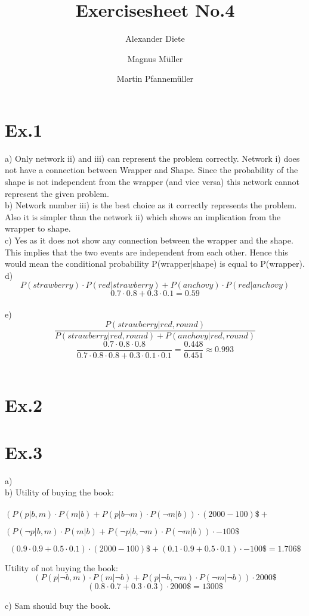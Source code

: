 \documentclass[11pt]{article}
\title{Exercisesheet No.4}
\author{Alexander Diete \and Magnus M\"uller \and Martin Pfannem\"uller}
\begin{document}
\maketitle

\section*{Ex.1}
a) Only network ii) and iii) can represent the problem correctly. Network i) does not have a connection between Wrapper and Shape. Since the probability of the shape is not independent from the wrapper (and vice versa) this network cannot represent the given problem. \\

b) Network number iii) is the best choice as it correctly represents the problem. Also it is simpler than the network ii) which shows an implication from the wrapper to shape. \\

c) Yes as it does not show any connection between the wrapper and the shape. This implies that the two events are independent from each other. Hence this would mean the conditional probability P(wrapper|shape) is equal to P(wrapper). \\

d) 
$$P(strawberry) \cdot P(red|strawberry) + P(anchovy) \cdot P(red|anchovy)$$
$$0.7 \cdot 0.8 + 0.3 \cdot 0.1 = 0.59$$ \\

e)
$$\frac{P(strawberry | red, round)}{P(strawberry | red, round) + P(anchovy | red, round)}$$
$$\frac{0.7 \cdot 0.8 \cdot 0.8}{0.7 \cdot 0.8 \cdot 0.8 + 0.3 \cdot 0.1 \cdot 0.1} = \frac{0.448}{0.451} \approx 0.993$$ \\

\section*{Ex.2}

\section*{Ex.3}
a) %
\\
b) Utility of buying the book: \\ \\
$(P(p|b,m) \cdot P(m|b) + P(p|b\neg m) \cdot P(\neg m|b)) \cdot (2000-100)\$ + $

$(P(\neg p|b, m) \cdot P(m|b) + P(\neg p|b,\neg m) \cdot P(\neg m|b)) \cdot -100\$$

$$(0.9 \cdot 0.9 + 0.5 \cdot 0.1) \cdot (2000-100)\$ +  (0.1 \cdot 0.9 + 0.5 \cdot 0.1) \cdot -100\$ = 1.706\$ $$

Utility of not buying the book:
$$(P(p|\neg b,m) \cdot P(m|\neg b) + P(p|\neg b, \neg m) \cdot P(\neg m|\neg b)) \cdot 2000\$ $$
$$ (0.8 \cdot 0.7 + 0.3 \cdot 0.3) \cdot 2000\$ = 1300\$$$

c) Sam should buy the book. 
\end{document}
